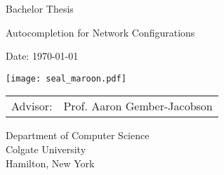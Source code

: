 \documentclass[../thesis.tex]{subfiles}
\begin{document}
\pagestyle{empty}

\begin{titlepage}
	\begin{center}\large

		\vfill
		\vfill
		\vfill
		\vfill

		Bachelor Thesis
		\vspace*{1.35cm}

		{\bfseries{\Large{Autocompletion for Network Configurations\par}}}

		\vspace*{1.35cm}

		\theauthor

		\vspace*{6.0mm}

		Date: \today 

		\vspace*{6.0mm}

        \texttt{[image: seal\_maroon.pdf]}

		\vspace*{6.0mm}
		\begin{tabular}{rl}
			Advisor: & Prof. Aaron Gember-Jacobson\\
		\end{tabular}

		\vspace*{7mm}



		\vspace*{7mm}
		Department of Computer Science \\
		Colgate University \\
		Hamilton, New York

		\vspace*{12mm}
		\vfill
	\end{center}

\end{titlepage}
\end{document}
